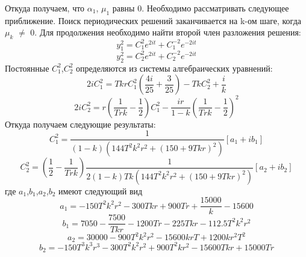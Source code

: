 \documentclass[12pt]{article}
\begin{document}
Откуда получаем, что $\alpha_1$, $\mu_1$ равны 0. Необходимо рассматривать следующее приближение. Поиск периодических решений заканчивается на k-ом шаге, когда $\mu_k$ $\neq$ 0.
Для продолжения необходимо найти второй член разложения решения:
\begin{equation*}
     y^2_1= C_1^2 e^{2 i t}+ C_1^{-2} e^{-2 i t}
  \end{equation*}
  \begin{equation*}
     y^2_2= C_2^2 e^{2 i t}+ C_2^{-2} e^{-2 i t}
  \end{equation*}
  Постоянные $C_1^2$,$C_2^2$ определяются из системы алгебраических уравнений:
  \begin{equation*}
     2i C_1^2=T k r C_1^2( \frac{4i}{25}+\frac{3}{25})- T k C_2^2 + \frac{i}{k}
 \end{equation*}
 \begin{equation*}
     2i C_2^2=r \left(  \frac{1}{T r k} - \frac{1}{2}\right) C_1^2-\frac{i r}{1-k} \left(\frac{1}{T r k} - \frac{1}{2} \right)^2
 \end{equation*}
 Откуда получаем следующие результаты:
\begin{equation*}
    C^2_1 =\frac{1}{(1-k)(144 T^2 k^2 r^2 + (150+9 T k r)^2)}[a_1 + i b_1]
\end{equation*}
\begin{equation*}
    C^2_2 =\left(\frac{1}{2}-\frac{1}{T r k}\right)\frac{1}{2(1-k)T k (144 T^2 k^2 r^2 + (150+9 T k r)^2)}\left[a_2+ i b_2 \right]
\end{equation*}
где $a_1$,$b_1$,$a_2$,$b_2$ имеют следующий вид
\begin{equation*}
    a_1=-150 T^2 k^2 r^2 -300 T k r +900 T r + \frac{15000}{k} -15600
\end{equation*}
\begin{equation*}
    b_1=7050-\frac{7500}{T k r}-1200 T r -225 T k r -112.5 T^2 k^2 r^2
\end{equation*}
\begin{equation*}
    a_2=30000-900T^2 k^2 r^2-15600 k r T +1200 k r^2 T^2
\end{equation*}
\begin{equation*}
    b_2= -150T^3 k^3 r^3-300 T^2 k^2 r^2 +900 T^2 k r^2  - 15600 T k r+15000 T r
\end{equation*}
\end{document}
